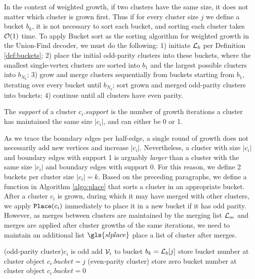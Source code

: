 In the context of weighted growth, if two clusters have the same size, it does not matter which cluster is grown first. Thus if for every cluster size $j$ we define a bucket $b_k$, it is not necessary to sort each bucket, and sorting each cluster takes $\mathcal{O}(1)$ time. To apply Bucket sort as the sorting algorithm for weighted growth in the Union-Find decoder, we must do the following: 1) initiate $\mathcal{L}_b$ per Definition \ref{def:buckets}; 2) place the initial odd-parity clusters into these buckets, where the smallest single-vertex clusters are sorted into $b_1$ and the largest possible clusters into $b_{N_b}$; 3) grow and merge clusters sequentially from buckets starting from $b_1$, iterating over every bucket until $b_{N_b}$; sort grown and merged odd-parity clusters into buckets; 4) continue until all clusters have even parity. 
\begin{definition}\label{def:clustersupport}
  The \emph{support} of a cluster $c_i.support$ is the number of growth iterations a cluster has maintained the same size $|c_i|$, and can either be 0 or 1. 
\end{definition}
As we trace the boundary edges per half-edge, a single round of growth does not necessarily add new vertices and increase $|c_i|$. Nevertheless, a cluster with size $|c_i|$ and boundary edges with support 1 is arguably \emph{larger} than a cluster with the same size $|c_i|$ and boundary edges with support 0. For this reason, we define 2 buckets per cluster size $|c_i|=k$. Based on the preceding paragraphs, we define a function  in Algorithm \ref{algo:place} that sorts a cluster in an appropriate bucket. After a cluster $c_i$ is grown, during which it may have merged with other clusters, we apply $\texttt{Place}(c_i)$ immediately to place it in a new bucket if it has odd parity. However, as merges between clusters are maintained by the merging list $\mathcal{L}_m$ and merges are applied after cluster growths of the same iterations, we need to maintain an additional list $\gls{slplace}$ place a list of cluster after merges.  

\begin{algorithm}[htb]
  \BlankLine
  \BlankLine

  \uIf(odd-parity cluster){$c_i$ is odd}{
    add $\mathcal{V}_i$ to bucket $b_k = \mathcal{L}_b[j]$\;
    store bucket number at cluster object $c_i.bucket = j$\;
  }
  \Else(even-parity cluster){
    store zero bucket number at cluster object $c_i.bucket = 0$\;
  }
  \BlankLine
  \caption{}\label{algo:place}
\end{algorithm}

